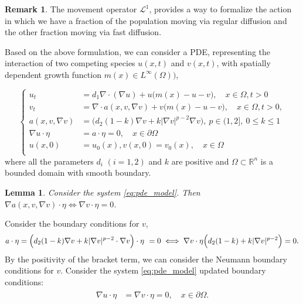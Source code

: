 \documentclass[10pt]{amsart}
\theoremstyle{plain}
\newtheorem{lemma}[theorem]{Lemma}
\theoremstyle{definition}
\newtheorem{remark}{Remark}
\begin{document}
\begin{remark}
The movement operator $\mathcal{L}^{1}$, provides a way to formalize the action in which we have a fraction of the population moving via regular diffusion and the other fraction moving via fast diffusion.
\end{remark}

Based on the above formulation, we can consider a PDE, representing the interaction of two competing species $u(x, t)$ and $v(x, t)$, with spatially dependent growth function $m(x) \in L^{\infty}(\Omega))$,


\begin{equation}
\label{eq:pde_model}
\left\{ \begin{array}{ll}
u_t &= d_1 \nabla \cdot (\nabla u) +  u\Big(m(x)-u-v\Big), \quad x\in \Omega, t>0\\
		v_t &= \nabla \cdot a(x,v,\nabla v)  + v\Big(m(x)-u-v\Big), \quad x\in\Omega,t>0, \\
	 a(x,v,\nabla v) & = \Big( d_2 (1-k)\nabla v  + k |\nabla v|^{p-2}  \nabla v \Big) , \ p \in (1,2], \ 0 \leq k \leq 1 \\
 \nabla u \cdot \eta &=a \cdot \eta=0, \quad x\in \partial \Omega \\
		u(x,0)&=u_0(x), v(x,0)=v_{0} (x), \quad x\in \Omega \\
\end{array}\right.
\end{equation}
where all the parameters $d_i$ $(i=1,2)$ and $k$ are positive and $\Omega \subset \mathbb{R}^n$ is a bounded domain with smooth boundary.




\begin{lemma}
Consider the system \eqref{eq:pde_model}. Then $\nabla a(x,v,\nabla v) \cdot \eta  \iff \nabla v \cdot \eta = 0$.
\end{lemma}
%
Consider the boundary conditions for $v$,
\[ a \cdot \eta = \Big( d_2 (1-k) \nabla v + k |\nabla v|^{p-2} \cdot \nabla v \Big) \cdot \eta \hspace{.05in} =0 \iff \nabla v \cdot \eta \Big( d_2 (1-k) + k |\nabla v|^{p-2} \Big)=0.\]
By the positivity of the bracket term, we can consider the Neumann boundary conditions for $v$. Consider the system \eqref{eq:pde_model} updated boundary conditions:
\begin{align}\label{pde_model_bc}
	\begin{split}
		 \nabla u \cdot \eta &=\nabla v \cdot \eta=0, \quad x\in \partial \Omega.
	\end{split}
\end{align}
\end{document}
